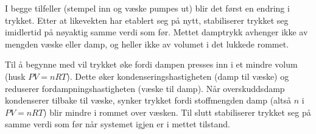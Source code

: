 
I begge tilfeller (stempel inn og væske pumpes ut) blir det først en endring i trykket. Etter at likevekten har etablert seg på nytt, stabiliserer trykket seg imidlertid på nøyaktig samme verdi som før. Mettet damptrykk avhenger ikke av mengden væske eller damp, og heller ikke av volumet i det lukkede rommet.

Til å begynne med vil trykket øke fordi dampen presses inn i et mindre volum (husk $PV = nRT$). Dette øker kondenseringshastigheten (damp til væske) og reduserer fordampningshastigheten (væske til damp). Når overskuddsdamp kondenserer tilbake til væske, synker trykket fordi stoffmengden damp (altså $n$ i $PV = nRT$) blir mindre i rommet over væsken. Til slutt stabiliserer trykket seg på samme verdi som før når systemet igjen er i mettet tilstand.








